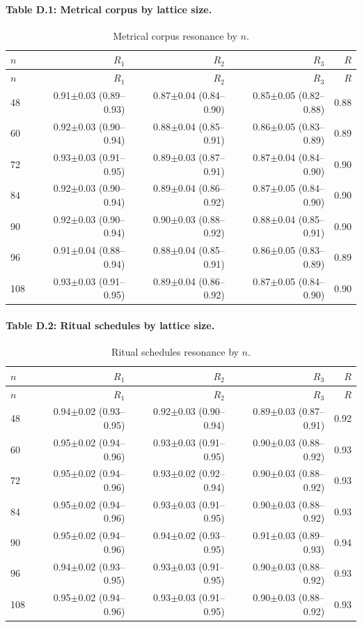 \documentclass[12pt]{article}
\numberwithin{equation}{section}
\theoremstyle{plain}
\theoremstyle{definition}
\theoremstyle{remark}
\begin{document}
\paragraph{Table D.1: Metrical corpus by lattice size.}
\begin{longtable}{lrrrr}
\caption{Metrical corpus resonance by $n$. \label{tab:metr-by-n}}\\
\toprule
$n$ & $R_1$ & $R_2$ & $R_3$ & $R$ \\
\midrule
\endfirsthead
\toprule
$n$ & $R_1$ & $R_2$ & $R_3$ & $R$ \\
\midrule
\endhead
48  & 0.91$\pm$0.03 (0.89--0.93) & 0.87$\pm$0.04 (0.84--0.90) & 0.85$\pm$0.05 (0.82--0.88) & 0.88 \\
60  & 0.92$\pm$0.03 (0.90--0.94) & 0.88$\pm$0.04 (0.85--0.91) & 0.86$\pm$0.05 (0.83--0.89) & 0.89 \\
72  & 0.93$\pm$0.03 (0.91--0.95) & 0.89$\pm$0.03 (0.87--0.91) & 0.87$\pm$0.04 (0.84--0.90) & 0.90 \\
84  & 0.92$\pm$0.03 (0.90--0.94) & 0.89$\pm$0.04 (0.86--0.92) & 0.87$\pm$0.05 (0.84--0.90) & 0.90 \\
90  & 0.92$\pm$0.03 (0.90--0.94) & 0.90$\pm$0.03 (0.88--0.92) & 0.88$\pm$0.04 (0.85--0.91) & 0.90 \\
96  & 0.91$\pm$0.04 (0.88--0.94) & 0.88$\pm$0.04 (0.85--0.91) & 0.86$\pm$0.05 (0.83--0.89) & 0.89 \\
108 & 0.93$\pm$0.03 (0.91--0.95) & 0.89$\pm$0.04 (0.86--0.92) & 0.87$\pm$0.05 (0.84--0.90) & 0.90 \\
\bottomrule
\end{longtable}

\paragraph{Table D.2: Ritual schedules by lattice size.}
\begin{longtable}{lrrrr}
\caption{Ritual schedules resonance by $n$. \label{tab:ritual-by-n}}\\
\toprule
$n$ & $R_1$ & $R_2$ & $R_3$ & $R$ \\
\midrule
\endfirsthead
\toprule
$n$ & $R_1$ & $R_2$ & $R_3$ & $R$ \\
\midrule
\endhead
48  & 0.94$\pm$0.02 (0.93--0.95) & 0.92$\pm$0.03 (0.90--0.94) & 0.89$\pm$0.03 (0.87--0.91) & 0.92 \\
60  & 0.95$\pm$0.02 (0.94--0.96) & 0.93$\pm$0.03 (0.91--0.95) & 0.90$\pm$0.03 (0.88--0.92) & 0.93 \\
72  & 0.95$\pm$0.02 (0.94--0.96) & 0.93$\pm$0.02 (0.92--0.94) & 0.90$\pm$0.03 (0.88--0.92) & 0.93 \\
84  & 0.95$\pm$0.02 (0.94--0.96) & 0.93$\pm$0.03 (0.91--0.95) & 0.90$\pm$0.03 (0.88--0.92) & 0.93 \\
90  & 0.95$\pm$0.02 (0.94--0.96) & 0.94$\pm$0.02 (0.93--0.95) & 0.91$\pm$0.03 (0.89--0.93) & 0.94 \\
96  & 0.94$\pm$0.02 (0.93--0.95) & 0.93$\pm$0.03 (0.91--0.95) & 0.90$\pm$0.03 (0.88--0.92) & 0.93 \\
108 & 0.95$\pm$0.02 (0.94--0.96) & 0.93$\pm$0.03 (0.91--0.95) & 0.90$\pm$0.03 (0.88--0.92) & 0.93 \\
\bottomrule
\end{longtable}
\end{document}
